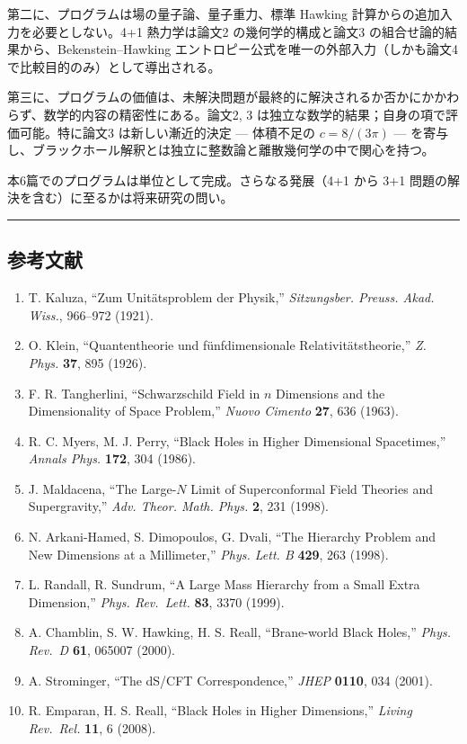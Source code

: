 \documentclass[a4paper,11pt]{ltjsarticle}
\theoremstyle{definition}
\providecommand{\tightlist}{\setlength{\itemsep}{0pt}\setlength{\parskip}{0pt}}
\begin{document}
第二に、プログラムは場の量子論、量子重力、標準 Hawking
計算からの追加入力を必要としない。4+1 熱力学は論文2
の幾何学的構成と論文3 の組合せ論的結果から、Bekenstein--Hawking
エントロピー公式を唯一の外部入力（しかも論文4
で比較目的のみ）として導出される。

第三に、プログラムの価値は、未解決問題が最終的に解決されるか否かにかかわらず、数学的内容の精密性にある。論文2,
3 は独立な数学的結果；自身の項で評価可能。特に論文3 は新しい漸近的決定
--- 体積不足の \(c = 8/(3\pi)\) ---
を寄与し、ブラックホール解釈とは独立に整数論と離散幾何学の中で関心を持つ。

本6篇でのプログラムは単位として完成。さらなる発展（4+1 から 3+1
問題の解決を含む）に至るかは将来研究の問い。

\begin{center}\rule{0.5\linewidth}{0.5pt}\end{center}

\subsection{参考文献}\label{ux53c2ux8003ux6587ux732e}

\begin{enumerate}
\def\labelenumi{\arabic{enumi}.}
\tightlist
\item
  T. Kaluza, ``Zum Unitätsproblem der Physik,'' \emph{Sitzungsber.
  Preuss. Akad. Wiss.}, 966--972 (1921).
\item
  O. Klein, ``Quantentheorie und fünfdimensionale Relativitätstheorie,''
  \emph{Z. Phys.} \textbf{37}, 895 (1926).
\item
  F. R. Tangherlini, ``Schwarzschild Field in \(n\) Dimensions and the
  Dimensionality of Space Problem,'' \emph{Nuovo Cimento} \textbf{27},
  636 (1963).
\item
  R. C. Myers, M. J. Perry, ``Black Holes in Higher Dimensional
  Spacetimes,'' \emph{Annals Phys.} \textbf{172}, 304 (1986).
\item
  J. Maldacena, ``The Large-\(N\) Limit of Superconformal Field Theories
  and Supergravity,'' \emph{Adv. Theor. Math. Phys.} \textbf{2}, 231
  (1998).
\item
  N. Arkani-Hamed, S. Dimopoulos, G. Dvali, ``The Hierarchy Problem and
  New Dimensions at a Millimeter,'' \emph{Phys. Lett. B} \textbf{429},
  263 (1998).
\item
  L. Randall, R. Sundrum, ``A Large Mass Hierarchy from a Small Extra
  Dimension,'' \emph{Phys. Rev.~Lett.} \textbf{83}, 3370 (1999).
\item
  A. Chamblin, S. W. Hawking, H. S. Reall, ``Brane-world Black Holes,''
  \emph{Phys. Rev.~D} \textbf{61}, 065007 (2000).
\item
  A. Strominger, ``The dS/CFT Correspondence,'' \emph{JHEP}
  \textbf{0110}, 034 (2001).
\item
  R. Emparan, H. S. Reall, ``Black Holes in Higher Dimensions,''
  \emph{Living Rev.~Rel.} \textbf{11}, 6 (2008).
\end{enumerate}
\end{document}
